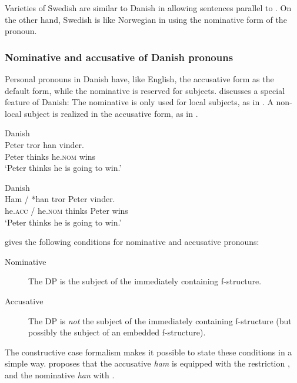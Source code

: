 \documentclass[output=paper,hidelinks]{langscibook}
\begin{document}
 Varieties of Swedish are similar to Danish in allowing sentences parallel to . On the other hand, Swedish is like Norwegian in using the nominative form of the pronoun.

\subsubsection{Nominative and accusative of Danish pronouns}

Personal pronouns in Danish have, like English, the accusative form as the default form, while the nominative is reserved for subjects. \citet{Oersnes02} discusses a special feature of Danish: The nominative is only used for local subjects, as in . A non-local subject is realized in the accusative form, as in .



\ea\label{ex:Scandinavian:103} Danish \citep{Oersnes02}\\
\gll
 {Peter} {tror} {han} {vinder.}\\
 Peter thinks he.\textsc{nom} wins\\
\glt `Peter thinks he is going to win.'\z

\ea\label{ex:Scandinavian:104} Danish \citep{Oersnes02}\\
\gll
 {Ham} {/} {*han} {tror} {Peter} {vinder.}\\
 he.\textsc{acc} / he.\textsc{nom} thinks Peter wins\\
\glt `Peter thinks he is going to win.'\z

\noindent \citet{Oersnes02} gives the following conditions for nominative and accusative pronouns:

\begin{description}
  \item[Nominative] The DP is the subject of the immediately containing f-structure.
\item[Accusative] The DP is \textit{not} the subject of the
  immediately containing f-structure (but possibly the subject of an
  embedded f-structure).
\end{description}

The constructive case formalism \citep{nordlinger1998constructive} makes it possible to state these conditions in a simple way. \citet{Oersnes02} proposes that the accusative \textit{ham} is equipped with the restriction , and the nominative \textit{han} with .
\end{document}
